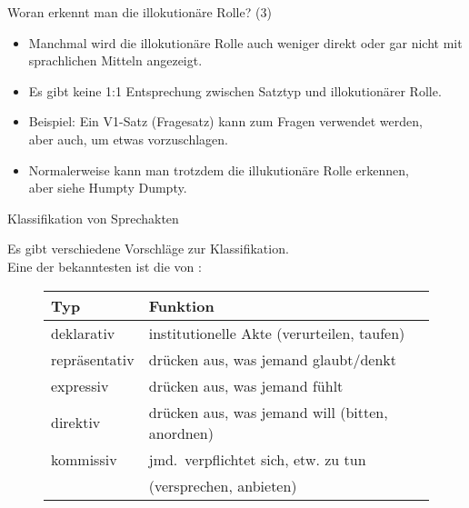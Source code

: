 \begin{frame}{Woran erkennt man die illokutionäre Rolle? (3)}
  
\begin{itemize}
\item Manchmal wird die illokutionäre Rolle auch weniger direkt oder gar nicht mit sprachlichen Mitteln angezeigt. \pause
\item Es gibt keine 1:1 Entsprechung zwischen Satztyp und illokutionärer Rolle. \pause
\item Beispiel: Ein V1-Satz (Fragesatz) kann zum Fragen verwendet werden,\\
      aber auch, um etwas vorzuschlagen.\pause
\item Normalerweise kann man trotzdem die illukutionäre Rolle erkennen,\\
      aber siehe Humpty Dumpty.
\end{itemize}


\end{frame}

\begin{frame}{Klassifikation von Sprechakten}

Es gibt verschiedene Vorschläge zur Klassifikation.\\
 Eine der bekanntesten ist die von \cite{Searle1979}:

\begin{figure}
\begin{tabular}{p{}|p{}}
  \alert{Typ}   & \alert{Funktion}\\
\hline
  deklarativ    &  institutionelle Akte (verurteilen, taufen)\\
  repräsentativ & drücken aus, was jemand glaubt/denkt\\
  expressiv     & drücken aus, was jemand fühlt\\
  direktiv      & drücken aus, was jemand will (bitten, anordnen)\\
  kommissiv     & jmd.\ verpflichtet sich, etw. zu tun \\
                & (versprechen, anbieten)\\
\end{tabular}
\end{figure}

\end{frame}





